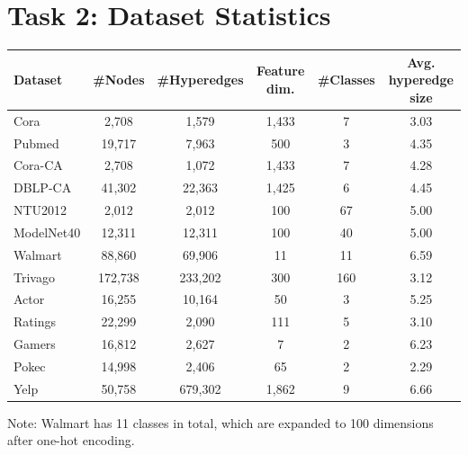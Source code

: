 
\section*{Task 2: Dataset Statistics}
\par
\begin{table}[htbp]
    \centering
    \renewcommand{\arraystretch}{1.2} 
    \begin{tabular}{lccccc}
        \toprule
        Dataset & \#Nodes & \#Hyperedges & Feature dim. & \#Classes & Avg. hyperedge size \\
        \midrule
        
        Cora & 2,708 & 1,579 & 1,433 & 7 & 3.03 \\
        Pubmed & 19,717 & 7,963 & 500 & 3 & 4.35 \\
        Cora-CA & 2,708 & 1,072 & 1,433 & 7 & 4.28 \\
        DBLP-CA & 41,302 & 22,363 & 1,425 & 6 & 4.45 \\
        NTU2012 & 2,012 & 2,012 & 100 & 67 & 5.00 \\
        ModelNet40 & 12,311 & 12,311 & 100 & 40 & 5.00 \\
        Walmart & 88,860 & 69,906 & 11 & 11 & 6.59 \\
        Trivago & 172,738 & 233,202 & 300 & 160 & 3.12 \\
        
        \midrule
        
        Actor & 16,255 & 10,164 & 50 & 3 & 5.25 \\
        Ratings & 22,299 & 2,090 & 111 & 5 & 3.10 \\
        Gamers & 16,812 & 2,627 & 7 & 2 & 6.23 \\
        Pokec & 14,998 & 2,406 & 65 & 2 & 2.29 \\
        Yelp & 50,758 & 679,302 & 1,862 & 9 & 6.66 \\
        
        \bottomrule
    \end{tabular}
    
    \vspace{0.8em} 
    \begin{flushleft}
    Note: Walmart has 11 classes in total, which are expanded to 100 dimensions after one-hot encoding.
    \end{flushleft}
\end{table}
\par
